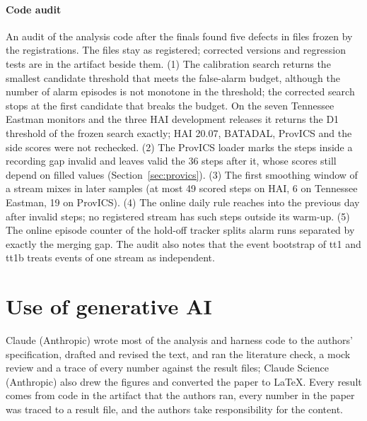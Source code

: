 \documentclass[sigconf,review,anonymous]{acmart}
\begin{document}
\paragraph{Code audit}
An audit of the analysis code after the finals found five defects in files frozen by the registrations.
The files stay as registered; corrected versions and regression tests are in the artifact beside them.
(1) The calibration search returns the smallest candidate threshold that meets the false-alarm budget,
although the number of alarm episodes is not monotone in the threshold; the corrected search stops at the
first candidate that breaks the budget. On the seven Tennessee Eastman monitors and the three HAI
development releases it returns the D1 threshold of the frozen search exactly; HAI 20.07, BATADAL, ProvICS
and the side scores were not rechecked. (2) The ProvICS loader marks the steps inside
a recording gap invalid and leaves valid the 36 steps after it, whose scores still depend on filled
values (Section~\ref{sec:provics}). (3) The first smoothing window of a stream mixes in later samples
(at most 49 scored steps on HAI, 6 on Tennessee Eastman, 19 on ProvICS). (4) The online daily rule reaches
into the previous day after invalid steps; no registered stream has such steps outside its warm-up. (5)
The online episode counter of the hold-off tracker splits alarm runs separated by exactly the merging
gap. The audit also notes that the event bootstrap of tt1 and tt1b treats events of one stream as
independent.

\FloatBarrier
\section*{Use of generative AI}

Claude (Anthropic) wrote most of the analysis and harness code to the authors' specification, drafted
and revised the text, and ran the literature check, a mock review and a trace of every number against
the result files; Claude Science (Anthropic) also drew the figures and converted the paper to LaTeX.
Every result comes from code in the artifact that the authors ran, every number in the paper was traced
to a result file, and the authors take responsibility for the content.
\end{document}
